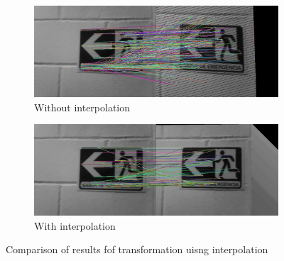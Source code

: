 \begin{figure}[!h]
	\centering
	\begin{subfigure}{0.5\textwidth}
	  \centering
	  \includegraphics[width=0.8\linewidth]{figs/without-interpolation.jpg}
	  \caption{Without interpolation}
	\end{subfigure}%
	\begin{subfigure}{0.5\textwidth}
	  \centering
	  \includegraphics[width=0.8\linewidth]{figs/with-interpolation.jpg}
	  \caption{With interpolation}
	\end{subfigure}%
	 \caption{Comparison of results fof transformation uisng interpolation}
	\label{fig:diff-interpolation}
\end{figure}



